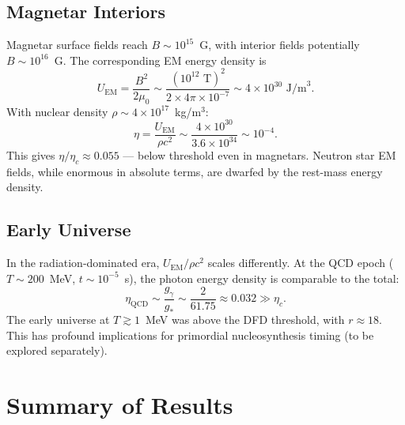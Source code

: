 \documentclass[aps,prd,twocolumn,superscriptaddress,nofootinbib]{revtex4-2}
\begin{document}
\subsection{Magnetar Interiors}

Magnetar surface fields reach $B \sim 10^{15}$~G, with interior fields potentially $B \sim 10^{16}$~G.  The corresponding EM energy density is
\begin{equation}
U_{\mathrm{EM}} = \frac{B^2}{2\mu_0} \sim \frac{(10^{12}\text{ T})^2}{2 \times 4\pi \times 10^{-7}} \sim 4 \times 10^{30}\text{ J/m}^3.
\end{equation}
With nuclear density $\rho \sim 4 \times 10^{17}$~kg/m$^3$:
\begin{equation}
\eta = \frac{U_{\mathrm{EM}}}{\rho c^2} \sim \frac{4 \times 10^{30}}{3.6 \times 10^{34}} \sim 10^{-4}.
\end{equation}
This gives $\eta/\eta_c \approx 0.055$ --- below threshold even in magnetars.  Neutron star EM fields, while enormous in absolute terms, are dwarfed by the rest-mass energy density.

\subsection{Early Universe}

In the radiation-dominated era, $U_{\mathrm{EM}}/\rho c^2$ scales differently.  At the QCD epoch ($T \sim 200$~MeV, $t \sim 10^{-5}$~s), the photon energy density is comparable to the total:
\begin{equation}
\eta_{\mathrm{QCD}} \sim \frac{g_\gamma}{g_*} \sim \frac{2}{61.75} \approx 0.032 \gg \eta_c.
\end{equation}
The early universe at $T \gtrsim 1$~MeV was above the DFD threshold, with $r \approx 18$.  This has profound implications for primordial nucleosynthesis timing (to be explored separately).

\section{Summary of Results}\label{sec:summary}
\end{document}
